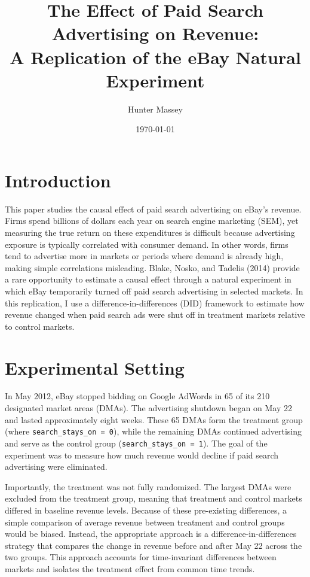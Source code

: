 \documentclass[12pt]{article}
\title{The Effect of Paid Search Advertising on Revenue: \\
	A Replication of the eBay Natural Experiment}
\author{Hunter Massey}
\date{\today}
\begin{document}
\maketitle

\section{Introduction}
This paper studies the causal effect of paid search advertising on eBay’s revenue. Firms spend billions of dollars each year on search engine marketing (SEM), yet measuring the true return on these expenditures is difficult because advertising exposure is typically correlated with consumer demand. In other words, firms tend to advertise more in markets or periods where demand is already high, making simple correlations misleading. Blake, Nosko, and Tadelis (2014) provide a rare opportunity to estimate a causal effect through a natural experiment in which eBay temporarily turned off paid search advertising in selected markets. In this replication, I use a difference-in-differences (DID) framework to estimate how revenue changed when paid search ads were shut off in treatment markets relative to control markets.


\section{Experimental Setting}
In May 2012, eBay stopped bidding on Google AdWords in 65 of its 210 designated market areas (DMAs). The advertising shutdown began on May 22 and lasted approximately eight weeks. These 65 DMAs form the treatment group (where \texttt{search\_stays\_on = 0}), while the remaining DMAs continued advertising and serve as the control group (\texttt{search\_stays\_on = 1}). The goal of the experiment was to measure how much revenue would decline if paid search advertising were eliminated.

Importantly, the treatment was not fully randomized. The largest DMAs were excluded from the treatment group, meaning that treatment and control markets differed in baseline revenue levels. Because of these pre-existing differences, a simple comparison of average revenue between treatment and control groups would be biased. Instead, the appropriate approach is a difference-in-differences strategy that compares the change in revenue before and after May 22 across the two groups. This approach accounts for time-invariant differences between markets and isolates the treatment effect from common time trends.
\end{document}
